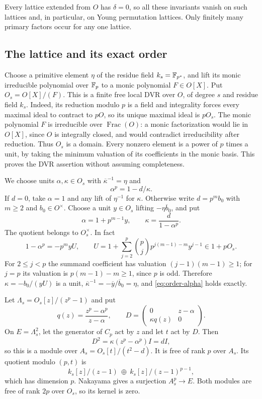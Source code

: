 Every lattice extended from $O$ has $\delta=0$, so all these invariants
vanish on such lattices and, in particular, on Young permutation
lattices.  Only finitely many primary factors occur for any one lattice.

\subsection{The lattice and its exact order}

Choose a primitive element $\eta$ of the residue field
$k_s=\mathbb F_{p^s}$, and lift its monic irreducible polynomial over
$\mathbb F_p$ to a monic polynomial $F\in O[X]$.  Put $O_s=O[X]/(F)$.
This is a finite free local DVR over $O$, of degree $s$ and residue
field $k_s$.  Indeed, its reduction modulo $p$ is a field and
integrality forces every maximal ideal to contract to $pO$, so its
unique maximal ideal is $pO_s$.  The monic polynomial $F$ is
irreducible over $\operatorname{Frac}(O)$: a monic factorization
would lie in $O[X]$, since $O$ is integrally closed, and would
contradict irreducibility after reduction.  Thus $O_s$ is a domain.
Every nonzero element is a power of $p$ times a unit, by taking
the minimum valuation of its coefficients in the monic basis.
This proves the DVR assertion without assuming completeness.

We choose units $\alpha,\kappa\in O_s$ with
$\overline\kappa^{-1}=\eta$ and
\begin{equation}\label{eq:order-alpha}
 \alpha^p=1-d/\kappa.
\end{equation}
If $d=0$, take $\alpha=1$ and any lift of $\eta^{-1}$ for $\kappa$.
Otherwise write $d=p^m b_0$ with $m\ge2$ and $b_0\in O^\times$.
Choose a unit $y\in O_s$ lifting $-\eta\overline b_0$, and put
\[
 \alpha=1+p^{m-1}y,\qquad
 \kappa=\frac{d}{1-\alpha^p}.
\]
The quotient belongs to $O_s^\times$.  In fact
\[
 1-\alpha^p=-p^m yU,\qquad
 U=1+\sum_{j=2}^{p}\binom pj p^{j(m-1)-m}y^{j-1}
       \in1+pO_s.
\]
For $2\le j<p$ the summand coefficient has valuation
$(j-1)(m-1)\ge1$; for $j=p$ its valuation is
$p(m-1)-m\ge1$, since $p$ is odd.  Therefore
$\kappa=-b_0/(yU)$ is a unit,
$\overline\kappa^{-1}=-\overline y/\overline b_0=\eta$,
and \eqref{eq:order-alpha} holds exactly.

Let $\Lambda_s=O_s[z]/(z^p-1)$ and put
\begin{equation}\label{eq:order-D-matrix}
 q(z)=\frac{z^p-\alpha^p}{z-\alpha},\qquad
 D=\begin{pmatrix}0&z-\alpha\\\kappa q(z)&0\end{pmatrix}.
\end{equation}
On $E=\Lambda_s^2$, let the generator of $C_p$ act by $z$ and let
$t$ act by $D$.  Then
\[
 D^2=\kappa(z^p-\alpha^p)I=dI,
\]
so this is a module over $A_s=O_s[t]/(t^2-d)$.
It is free of rank $p$ over $A_s$.  Its quotient modulo $(p,t)$ is
\[
 k_s[z]/(z-1)\ \oplus\ k_s[z]/(z-1)^{p-1},
\]
which has dimension $p$.  Nakayama gives a surjection $A_s^p\to E$.
Both modules are free of rank $2p$ over $O_s$, so its kernel is zero.

